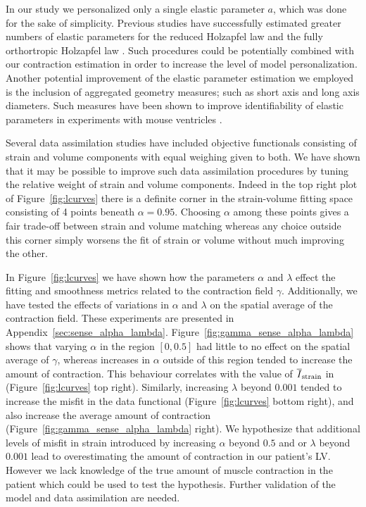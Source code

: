 In our study we personalized only a single elastic parameter $a$, which was done for the sake of simplicity.
Previous studies have successfully estimated greater numbers of elastic parameters for the reduced Holzapfel
law \cite{asner2015estimation} and the fully orthortropic Holzapfel law \cite{gao2015parameter}.
Such procedures could be potentially combined with our 
contraction estimation in order to increase the level of model personalization.
Another potential improvement of the elastic parameter estimation we employed 
is the inclusion of aggregated geometry measures;
such as short axis and long axis diameters. Such measures have been shown
to improve identifiability of elastic parameters in experiments
with mouse ventricles \cite{nordbo2014computational}.


Several data assimilation studies \cite{mojsejenko2014estimating,
  sun2009computationally} have included objective functionals
consisting of strain and volume components with equal weighing given
to both. We have shown that it may be possible to improve such data
assimilation procedures by tuning the relative weight of strain and
volume components. Indeed in the top right plot of Figure~\ref{fig:lcurves} there is 
a definite corner in the strain-volume fitting space consisting of 4 points
beneath $\alpha = 0.95$. Choosing $\alpha$ among these points gives
a fair trade-off between strain and volume matching whereas any choice outside this
corner simply worsens the fit of strain or volume without much improving the other.

In Figure~\ref{fig:lcurves} we have shown how the parameters $\alpha$
and $\lambda$ effect the fitting and smoothness 
 metrics related to the contraction field $\gamma$. Additionally, we have
tested the effects of variations in $\alpha$ and $\lambda$ on the spatial
average of the contraction field. These experiments are presented in Appendix~\ref{sec:sense_alpha_lambda}.
Figure~\ref{fig:gamma_sense_alpha_lambda} shows that varying $\alpha$ in the region $[0, 0.5]$ had little to no effect on the spatial average of
$\gamma$, whereas increases in $\alpha$ outside of this region tended to increase the amount of 
contraction. This behaviour correlates with the value of $\overline{I}_{\text{strain}}$ in (Figure~\ref{fig:lcurves}
top right). Similarly, increasing $\lambda$ beyond $0.001$ tended to increase the misfit in the data 
functional (Figure~\ref{fig:lcurves} bottom right), and also increase the average amount of
contraction (Figure~\ref{fig:gamma_sense_alpha_lambda} right).
We hypothesize that additional levels of misfit in strain introduced by increasing
$\alpha$ beyond $0.5$ and or $\lambda$ beyond $0.001$ lead to overestimating 
the amount of contraction in our patient's LV. However we lack knowledge of the
true amount of muscle contraction in the patient which could be used to test the hypothesis.
Further validation of the model and data assimilation are needed.


